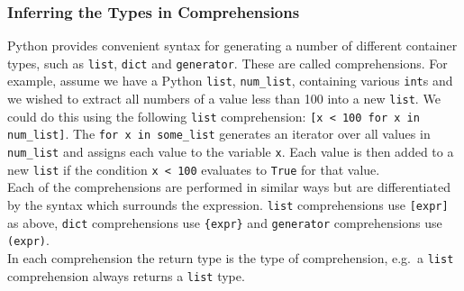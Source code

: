 \documentclass[12pt, titlepage]{article}
\begin{document}
\subsubsection{Inferring the Types in Comprehensions}
Python provides convenient syntax for generating a number of different container types, such as \texttt{list}, \texttt{dict} and \texttt{generator}. These are called comprehensions. For example, assume we have a Python \texttt{list}, \texttt{num\_list}, containing various \texttt{int}s and we wished to extract all numbers of a value less than 100 into a new \texttt{list}. We could do this using the following \texttt{list} comprehension: \texttt{[x < 100 for x in num\_list]}. The \texttt{for x in some\_list} generates an iterator over all values in \texttt{num\_list} and assigns each value to the variable \texttt{x}. Each value is then added to a new \texttt{list} if the condition \texttt{x < 100} evaluates to \texttt{True} for that value. \\
\indent Each of the comprehensions are performed in similar ways but are differentiated by the syntax which surrounds the expression. \texttt{list} comprehensions use \texttt{[expr]} as above, \texttt{dict} comprehensions use \texttt{\{expr\}} and \texttt{generator} comprehensions use \texttt{(expr)}. \\
\indent In each comprehension the return type is the type of comprehension, e.g.\ a \texttt{list} comprehension always returns a \texttt{list} type.
\end{document}
